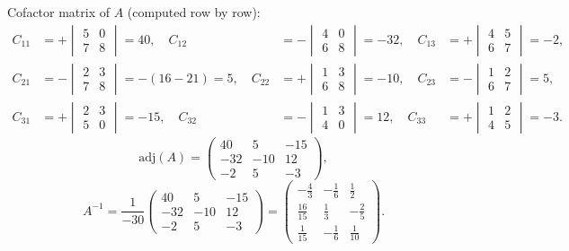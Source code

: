 \documentclass[12pt,a3paper]{article}
\begin{document}
\begin{tcolorbox}
Cofactor matrix of $A$ (computed row by row):
\begin{align*}
C_{11}&=+\begin{vmatrix}5&0\\7&8\end{vmatrix}=40,\quad
C_{12}&=-\begin{vmatrix}4&0\\6&8\end{vmatrix}=-32,\quad
C_{13}&=+\begin{vmatrix}4&5\\6&7\end{vmatrix}=-2,\\[4pt]
C_{21}&=-\begin{vmatrix}2&3\\7&8\end{vmatrix}=-(16-21)=5,\quad
C_{22}&=+\begin{vmatrix}1&3\\6&8\end{vmatrix}=-10,\quad
C_{23}&=-\begin{vmatrix}1&2\\6&7\end{vmatrix}=5,\\[4pt]
C_{31}&=+\begin{vmatrix}2&3\\5&0\end{vmatrix}=-15,\quad
C_{32}&=-\begin{vmatrix}1&3\\4&0\end{vmatrix}=12,\quad
C_{33}&=+\begin{vmatrix}1&2\\4&5\end{vmatrix}=-3.
\end{align*}
\[
  \mathrm{adj}(A) = \begin{pmatrix}40&5&-15\\-32&-10&12\\-2&5&-3\end{pmatrix},
\]
\[
  A^{-1} = \frac{1}{-30}\begin{pmatrix}40&5&-15\\-32&-10&12\\-2&5&-3\end{pmatrix}
  = \begin{pmatrix}-\frac{4}{3}&-\frac{1}{6}&\frac{1}{2}\\[4pt]\frac{16}{15}&\frac{1}{3}&-\frac{2}{5}\\[4pt]\frac{1}{15}&-\frac{1}{6}&\frac{1}{10}\end{pmatrix}.
\]



\end{tcolorbox}
\end{document}
